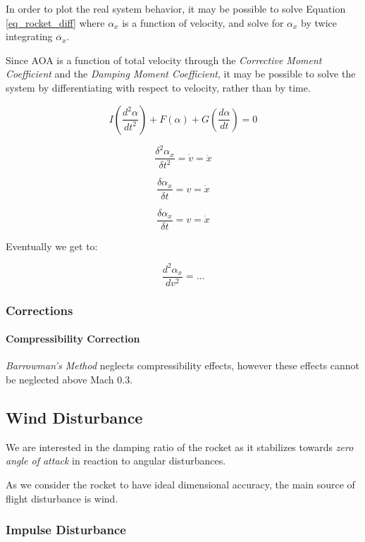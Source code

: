 \documentclass[]{article}
\let\oldparagraph\paragraph
\renewcommand{\paragraph}[1]{\oldparagraph{#1}\mbox{}}
\begin{document}
In order to plot the real system behavior, it may be possible to solve
Equation \ref{eq_rocket_diff} where \(\alpha_x\) is a function of
velocity, and solve for \(\alpha_x\) by twice integrating
\(\ddot{\alpha_x}\).

Since AOA is a function of total velocity through the \emph{Corrective
Moment Coefficient} and the \emph{Damping Moment Coefficient}, it may be
possible to solve the system by differentiating with respect to
velocity, rather than by time.

\[
I \left( \dfrac{d^2\alpha}{dt^2} \right) + F(\alpha) + G \left(\dfrac{d\alpha}{dt} \right) = 0
\]

\[
\dfrac{\delta^2 \alpha_x}{\delta t^2} = \dot{v} = \ddot{x}
\]

\[
\dfrac{\delta \alpha_x}{\delta t} = v = \dot{x}
\]

\[
\dfrac{\delta \alpha_x}{\delta t} = v = \dot{x}
\]

Eventually we get to:

\[
\dfrac{d^2\alpha_x}{dv^2} = ...
\]

\subsubsection{Corrections}\label{corrections}

\paragraph{Compressibility Correction}\label{compressibility-correction}

\emph{Barrowman's Method} neglects compressibility effects, however
these effects cannot be neglected above Mach 0.3.

\subsection{Wind Disturbance}\label{wind-disturbance}

We are interested in the damping ratio of the rocket as it stabilizes
towards \emph{zero angle of attack} in reaction to angular disturbances.

As we consider the rocket to have ideal dimensional accuracy, the main
source of flight disturbance is wind.

\subsubsection{Impulse Disturbance}\label{impulse-disturbance}
\end{document}
